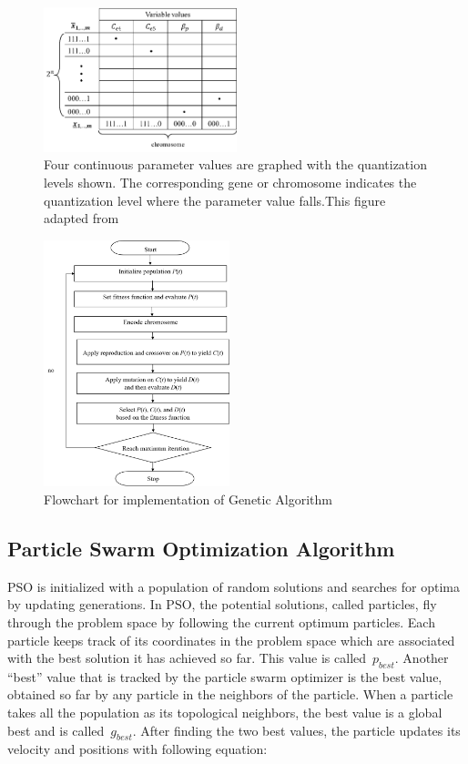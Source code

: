 \begin{figure}[h]
	\centering
	\includegraphics[width=0.5\textwidth]{images/chromosome.png}
	\caption{Four continuous parameter values are graphed with the quantization levels shown. The corresponding gene or chromosome indicates the quantization level where the parameter value falls.This figure adapted from \cite{haupt2004practical}}
	\label{decode}
\end{figure}


\begin{figure}[h]
	\centering
	\includegraphics[width=0.48\textwidth]{images/GA.png}
	\caption{Flowchart for implementation of Genetic Algorithm}
	\label{Flowchart for implementation of genetic algorithm}
\end{figure}

\subsection{Particle Swarm Optimization Algorithm}

PSO is initialized with a population of random solutions and searches for optima by updating generations. In PSO, the potential solutions, called particles, fly through the problem space by following the current optimum particles. Each particle keeps track of its coordinates in the problem space which are associated with the best solution it has achieved so far. This value is called $p_{best}$. Another “best” value that is tracked by the particle swarm optimizer is the best value, obtained so far by any particle in the neighbors of the particle. When a particle takes all the population as its topological neighbors, the best value is a global best and is called $g_{best}$. After finding the two best values, the particle updates its velocity and positions with following equation:


